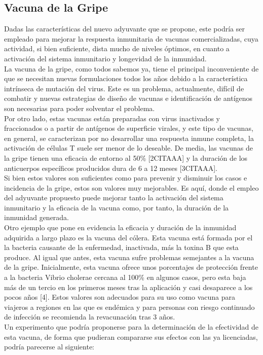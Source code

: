 \documentclass[a4paper,11pt]{article}
\begin{document}
\subsection{Vacuna de la Gripe}
Dadas las características del nuevo adyuvante que se propone, este podría ser empleado para mejorar la respuesta inmunitaria de vacunas comercializadas, cuya actividad, si bien suficiente, dista mucho de niveles óptimos, en cuanto a activación del sistema inmunitario y longevidad de la inmunidad.
\\La vacuna de la gripe, como todos sabemos ya, tiene el principal inconveniente de que se necesitan nuevas formulaciones todos los años debido a la característica intrínseca de mutación del virus. Este es un problema, actualmente, difícil de combatir y nuevas estrategias de diseño de vacunas e identificación de antígenos son necesarias para poder solventar el problema.
\\Por otro lado, estas vacunas están preparadas con virus inactivados y fraccionados o a partir de antígenos de superficie virales, y este tipo de vacunas, en general, se caracterizan por no desarrollar una respuesta inmune completa, la activación de células T suele ser menor de lo deseable. De media, las vacunas de la gripe tienen una eficacia de entorno al 50\% [2CITAAA] y la duración de los anticuerpos específicos producidos dura de 6 a 12 meses [3CITAAA].
\\Si bien estos valores son suficientes como para prevenir y disminuir los casos e incidencia de la gripe, estos son valores muy mejorables. Es aquí, donde el empleo del adyuvante propuesto puede mejorar tanto la activación del sistema inmunitario y la eficacia de la vacuna como, por tanto, la duración de la inmunidad generada.
\\Otro ejemplo que pone en evidencia la eficacia y duración de la inmunidad adquirida a largo plazo es la vacuna del cólera. Esta vacuna está formada por el la bacteria causante de la enfermedad, inactivada, más la toxina B que esta produce. Al igual que antes, esta vacuna sufre problemas semejantes a la vacuna de la gripe. Inicialmente, esta vacuna ofrece unos porcentajes de protección frente a la bacteria Vibrio cholerae cercana al 100\% en algunos casos, pero esta baja más de un tercio en los primeros meses tras la aplicación y casi desaparece a los pocos años [4]. Estos valores son adecuados para su uso como vacuna para viajeros a regiones en las que es endémica y para personas con riesgo continuado de infección se recomienda la revacunación tras 3 años.
\\Un experimento que podría proponerse para la determinación de la efectividad de esta vacuna, de forma que pudieran compararse sus efectos con las ya licenciadas, podría parecerse al siguiente:
\end{document}
